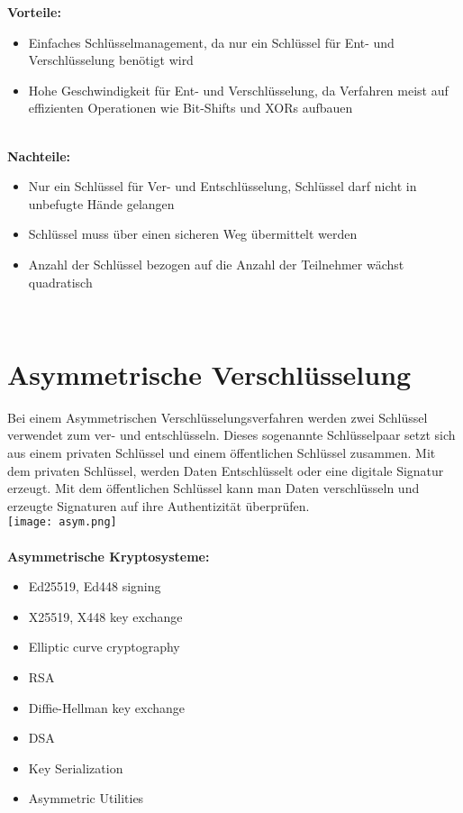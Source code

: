 \documentclass{article}
\begin{document}
\textbf{Vorteile:}
\begin{itemize}
    \item Einfaches Schlüsselmanagement, da nur ein Schlüssel für Ent- und Verschlüsselung benötigt wird
    \item Hohe Geschwindigkeit für Ent- und Verschlüsselung, da Verfahren meist auf effizienten Operationen wie Bit-Shifts und XORs aufbauen
\end{itemize}\cite{1} \\

\textbf{Nachteile:}
\begin{itemize}
    \item Nur ein Schlüssel für Ver- und Entschlüsselung, Schlüssel darf nicht in unbefugte Hände gelangen
    \item Schlüssel muss über einen sicheren Weg übermittelt werden
    \item Anzahl der Schlüssel bezogen auf die Anzahl der Teilnehmer wächst quadratisch
\end{itemize}\cite{1} \\

\section*{Asymmetrische Verschlüsselung}

Bei einem Asymmetrischen Verschlüsselungsverfahren werden zwei Schlüssel verwendet zum ver- und entschlüsseln. Dieses sogenannte Schlüsselpaar setzt sich aus einem privaten Schlüssel und einem öffentlichen Schlüssel zusammen. Mit dem privaten Schlüssel, werden Daten Entschlüsselt oder eine digitale Signatur erzeugt. Mit dem öffentlichen Schlüssel kann man Daten verschlüsseln und erzeugte Signaturen auf ihre Authentizität überprüfen. \\

\texttt{[image: asym.png]} \\
\cite{4} \\

\textbf{Asymmetrische Kryptosysteme:}
\begin{itemize}
    \item Ed25519, Ed448 signing
    \item X25519, X448 key exchange
    \item Elliptic curve cryptography
    \item RSA
    \item Diffie-Hellman key exchange
    \item DSA
    \item Key Serialization
    \item Asymmetric Utilities
\end{itemize}
\cite{2} \\
\end{document}
